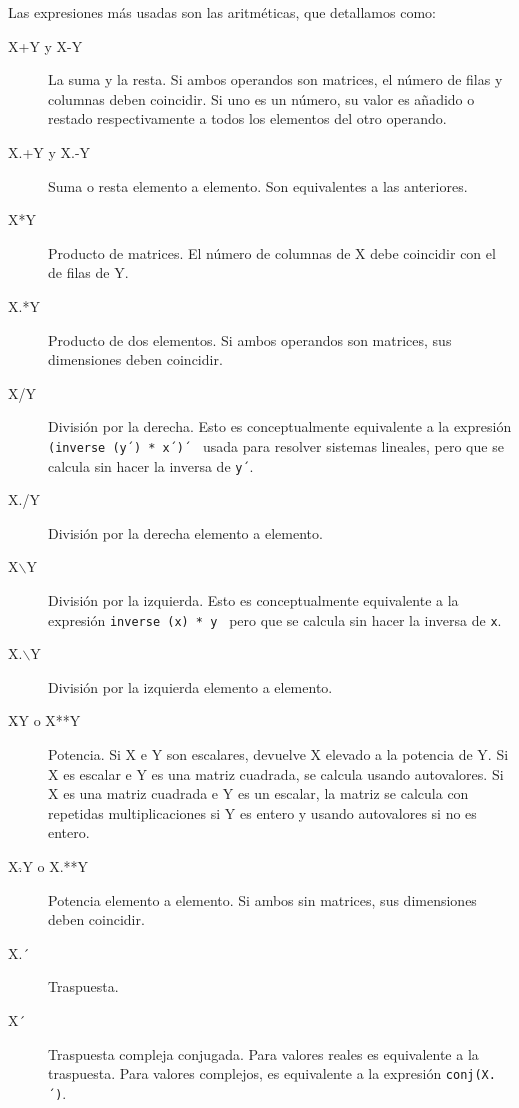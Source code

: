 Las expresiones más usadas son las aritméticas, que detallamos como:

\begin{description}

\item[  X+Y y  X-Y  ] La  suma  y  la resta.  Si  ambos operandos  son
matrices, el número de filas y  columnas deben coincidir. Si uno es un
número,  su valor  es añadido  o restado  respectivamente a  todos los
elementos del otro operando.

\item[  X.+Y  y  X.-Y  ]  Suma   o  resta  elemento  a  elemento.  Son
equivalentes a las anteriores.

\item[ X*Y  ] Producto de  matrices. El número  de columnas de  X debe
coincidir con el de filas de Y.

\item[  X.*Y ]  Producto  de  dos elementos.  Si  ambos operandos  son
matrices, sus dimensiones deben coincidir.

\item[  X/Y  ]  División  por  la  derecha.  Esto  es  conceptualmente
equivalente a  la expresión  {\tt (inverse  (y´) *  x´)´ }  usada para
resolver sistemas lineales,  pero que se calcula sin  hacer la inversa
de {\tt y´}.

\item[X./Y] División por la derecha elemento a elemento.

\item[X$\backslash$Y]   División    por   la   izquierda.    Esto   es
conceptualmente equivalente a la expresión {\tt inverse (x) * y } pero
que se calcula sin hacer la inversa de {\tt x}.

\item[X.$\backslash$Y] División por la izquierda elemento a elemento.

\item[X$\hat{}$Y o X**Y] Potencia. Si X  e Y son escalares, devuelve X
elevado  a la  potencia  de Y.  Si  X es  escalar e  Y  es una  matriz
cuadrada, se calcula usando autovalores. Si X es una matriz cuadrada e
Y es un  escalar, la matriz se calcula  con repetidas multiplicaciones
si Y es entero y usando autovalores si no es entero.

\item[X.$\hat{}$Y o X.**Y] Potencia elemento  a elemento. Si ambos sin
matrices, sus dimensiones deben coincidir.

\item[X.´] Traspuesta. 

\item[X´]  Traspuesta  compleja  conjugada.  Para  valores  reales  es
equivalente a la traspuesta. Para  valores complejos, es equivalente a
la expresión {\tt conj(X.´)}.

\end{description}


